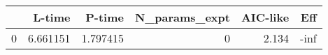 \begin{tabular}{lrrrrr}
\toprule
{} &    L-time &    P-time &  N\_params\_expt &  AIC-like &  Eff \\
\midrule
0 &  6.661151 &  1.797415 &              0 &     2.134 & -inf \\
\bottomrule
\end{tabular}
